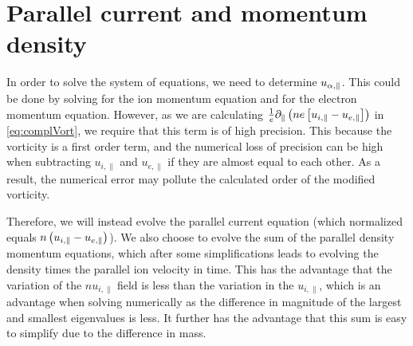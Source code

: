 \section{Parallel current and momentum density}
In order to solve the system of equations, we need to determine $u_{\alpha,\|}$.
This could be done by solving for the ion momentum equation and for the electron momentum equation.
However, as we are calculating $\frac{1}{e}\partial_\|\left(ne\left[u_{i,\|} - u_{e,\|}\right]\right)$ in \cref{eq:complVort}, we require that this term is of high precision.
This because the vorticity is a first order term, and the numerical loss of precision can be high when subtracting $u_{i,\|}$ and $u_{e,\|}$ if they are almost equal to each other.
As a result, the numerical error may pollute the calculated order of the modified vorticity.

Therefore, we will instead evolve the parallel current equation (which normalized equals $n\left(u_{i,\|} - u_{e,\|}\right)$).
We also choose to evolve the sum of the parallel density momentum equations, which after some simplifications leads to evolving the density times the parallel ion velocity in time.
This has the advantage that the variation of the $nu_{i,\|}$ field is less than the variation in the $u_{i,\|}$, which is an advantage when solving numerically as the difference in magnitude of the largest and smallest eigenvalues is less.
It further has the advantage that this sum is easy to simplify due to the difference in mass.

